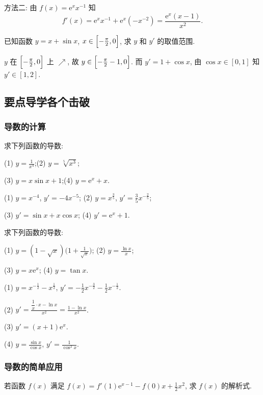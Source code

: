     方法二: 由 $f(x)=\mathrm{e}^x x^{-1}$ 知
    \[f'(x)=\mathrm{e}^x x^{-1}+\mathrm{e}^x (-x^{-2})
      = \frac{\mathrm{e}^x(x-1)}{x^2}.\]
  \endsolution
  
  \begin{exercise}
    已知函数 $y=x+\sin x$, $x\in\Bigl[-\frac{\pi}2,0\Bigr]$, 
    求 $y$ 和 $y'$ 的取值范围.
  \end{exercise}

  \beginsolution
    $y$ 在 $\Bigl[-\frac{\pi}2,0\Bigr]$ 上 $\nearrow$, 故 $y\in\Bigl[-\frac{\pi}2-1,0\Bigr]$. 而 $y'=1+\cos x$, 由 $\cos x\in[0,1]$ 知 $y'\in[1,2]$.
  \endsolution
  
  \subsection{要点导学\quad 各个击破}
  \subsubsection{导数的计算}
  \begin{example}
    求下列函数的导数:
    
    (1) $y=\frac1{x^4}$;\qquad (2) $y=\sqrt[5]{x^3}$;
    
    (3) $y=x\sin x+1$;\qquad (4) $y=\mathrm{e}^x +x$.
  \end{example}

  \beginsolution
    (1) $y=x^{-4}$, $y'=-4x^{-5}$;\quad
    (2) $y=x^{\frac35}$, $y'=\frac35 x^{-\frac25}$;
    
    (3) $y'=\sin x+x\cos x$;\quad
    (4) $y'=\mathrm{e}^x +1$.
  \endsolution
  
  \lianxi
  \begin{exercise}[s]
    求下列函数的导数:
    
    (1) $y=(1-\sqrt{x})\Big(1+\frac1{\sqrt{x}}\Big)$;\qquad
    (2) $y= \frac{\ln x}x$;
    
    (3) $y=x\mathrm{e}^x$;\qquad
    (4) $y=\tan x$.
  \end{exercise}

  \beginsolution
    (1) $y=x^{-\frac12}-x^{\frac12}$, $y'=-\frac12x^{-\frac32}-\frac12x^{-\frac12}$.
    
    (2) $y'= \frac{\dfrac1x\cdot x-\ln x}{x^2}= \frac{1-\ln x}{x^2}$.
    
    (3) $y'=(x+1)\mathrm{e}^x$.
    
    (4) $y=\frac{\sin x}{\cos x}$, $y'=\frac1{\cos^2 x}$.
  \endsolution
  
  \subsubsection{导数的简单应用}
  \begin{example}
    若函数 $f(x)$ 满足 $f(x)=f'(1)\mathrm{e}^{x-1} -f(0)x+ \frac12 x^2$, 
    求 $f(x)$ 的解析式.
  \end{example}

